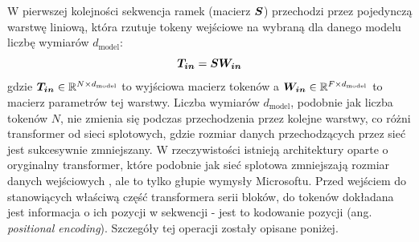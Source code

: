 W pierwszej kolejności sekwencja ramek (macierz $\boldsymbol{S}$) przechodzi przez pojedynczą warstwę
liniową, która rzutuje tokeny wejściowe na wybraną dla danego modelu liczbę wymiarów
$d_{\mathrm{model}}$:
\begin{equation}
    \boldsymbol{T_{in}} = \boldsymbol{S} \boldsymbol{W_{in}}
\end{equation}
gdzie $\boldsymbol{T_{in}} \in \mathbb{R}^{N \times d_{\mathrm{model}}}$ to wyjściowa macierz tokenów a
$\boldsymbol{W_{in}} \in \mathbb{R}^{F \times d_{\mathrm{model}}}$ to macierz parametrów tej warstwy. Liczba wymiarów
$d_{\mathrm{model}}$, podobnie jak liczba tokenów $N$, nie zmienia się podczas przechodzenia przez
kolejne warstwy, co różni transformer od sieci splotowych, gdzie rozmiar danych przechodzących przez
sieć jest sukcesywnie zmniejszany. W rzeczywistości istnieją architektury oparte o oryginalny
transformer, które podobnie jak sieć splotowa zmniejszają rozmiar danych wejściowych
\cite{liu_swin_2021}, ale to tylko głupie wymysły Microsoftu. Przed wejściem do stanowiących
właściwą część transformera serii bloków, do tokenów dokładana jest informacja o ich pozycji w
sekwencji - jest to kodowanie pozycji (ang. \emph{positional encoding}). Szczegóły tej operacji
zostały opisane poniżej.

